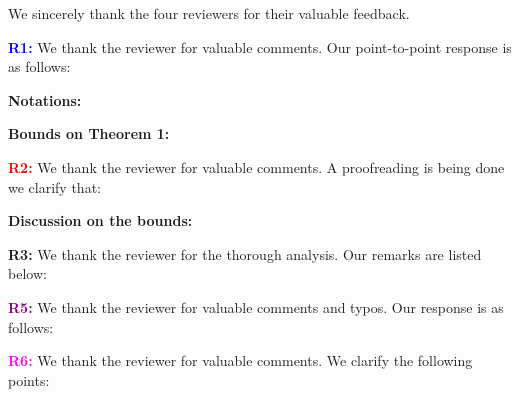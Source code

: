\documentclass{article}
\begin{document}
We sincerely thank the four reviewers for their valuable feedback.


\textbf{\textcolor{blue}{R1:}} We thank the reviewer for valuable comments. Our point-to-point response is as follows: 


\textbf{Notations:} 

\textbf{Bounds on Theorem 1:} 
 


\textbf{\textcolor{red}{R2:}} We thank the reviewer for valuable comments. A proofreading is being done we clarify that: 

\textbf{Discussion on the bounds:} 
 
\textbf{\textcolor{green!50!black}{R3:}} We thank the reviewer for the thorough analysis. Our remarks are listed below: 




 

\textbf{\textcolor{purple}{R5:}} We thank the reviewer for valuable comments and typos. Our response is as follows: 

 

\textbf{\textcolor{magenta}{R6:}} We thank the reviewer for valuable comments. We clarify the following points: 
\end{document}
